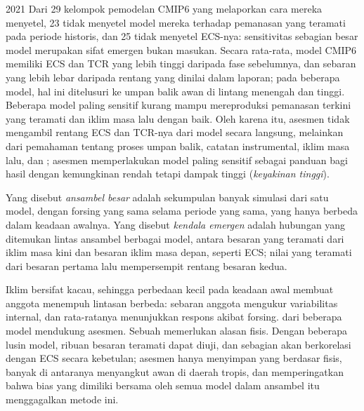 \begin{dated}{2021}
Dari 29 kelompok pemodelan CMIP6 yang melaporkan cara mereka menyetel, 23 tidak
menyetel model mereka terhadap pemanasan yang teramati pada periode historis, dan
25 tidak menyetel ECS-nya: sensitivitas sebagian besar model merupakan sifat emergen
bukan masukan. Secara rata-rata, model CMIP6 memiliki ECS dan TCR yang lebih tinggi
daripada fase sebelumnya, dan sebaran yang lebih lebar daripada rentang
yang dinilai dalam laporan; pada beberapa model, hal ini ditelusuri ke umpan balik
awan di lintang menengah dan tinggi. Beberapa model paling sensitif
kurang mampu mereproduksi pemanasan terkini yang teramati dan iklim masa lalu
dengan baik. Oleh karena itu, asesmen tidak mengambil rentang ECS dan TCR-nya dari
model secara langsung, melainkan dari pemahaman tentang proses umpan balik,
catatan instrumental, iklim masa lalu, dan ; asesmen memperlakukan model paling sensitif sebagai panduan
bagi hasil dengan kemungkinan rendah tetapi dampak tinggi (\emph{keyakinan tinggi}).
\end{dated}

\begin{definition}\label{def:b3:climate-models:evaluation}
Yang disebut \emph{ansambel besar} adalah sekumpulan banyak simulasi
dari satu model, dengan forsing yang sama selama periode yang sama, yang hanya berbeda
dalam keadaan awalnya. Yang disebut \emph{kendala
emergen} adalah hubungan yang ditemukan lintas
ansambel berbagai model, antara besaran yang teramati dari
iklim masa kini dan besaran iklim masa depan, seperti ECS; nilai
yang teramati dari besaran pertama lalu mempersempit rentang besaran kedua.
\end{definition}

Iklim bersifat kacau, sehingga perbedaan kecil pada keadaan awal membuat
anggota  menempuh lintasan berbeda: sebaran anggota
mengukur variabilitas internal, dan rata-ratanya menunjukkan respons
akibat forsing.  dari beberapa model mendukung asesmen. Sebuah
 memerlukan alasan fisis. Dengan beberapa lusin model,
ribuan besaran teramati dapat diuji, dan sebagian akan berkorelasi dengan
ECS secara kebetulan; asesmen hanya menyimpan yang berdasar fisis, banyak di antaranya
menyangkut awan di daerah tropis, dan memperingatkan bahwa bias yang dimiliki bersama oleh semua
model dalam ansambel itu menggagalkan metode ini.

